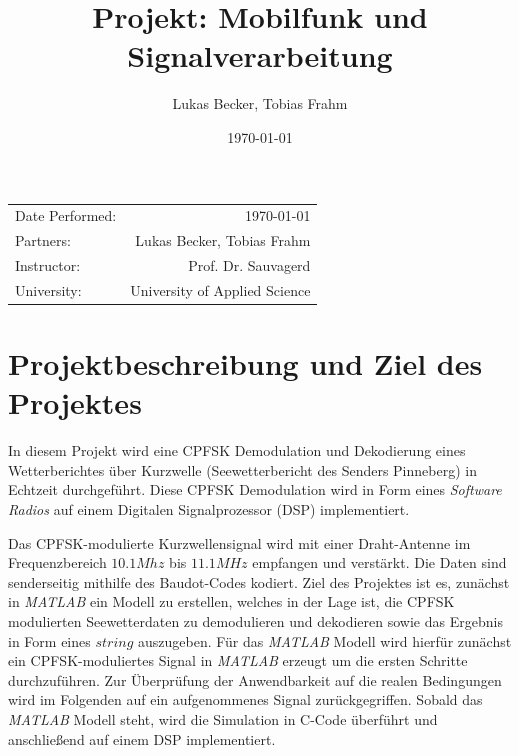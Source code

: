 \documentclass{article}
\title{Projekt: Mobilfunk und Signalverarbeitung} %
\author{Lukas Becker, Tobias Frahm} %
\date{\today} %
\begin{document}
\maketitle %

\begin{center}
\begin{tabular}{l r}
Date Performed: & \today \\ %
Partners: & Lukas Becker, Tobias Frahm \\ %
Instructor: & Prof. Dr. Sauvagerd \\%
University: & University of Applied Science 
\end{tabular}
\end{center}

\begin{acronym}
\end{acronym}



\section{Projektbeschreibung und Ziel des Projektes}

In diesem Projekt wird eine \ac{CPFSK} Demodulation und Dekodierung eines Wetterberichtes über Kurzwelle 
(Seewetterbericht des  Senders  Pinneberg)  in  Echtzeit  durchgeführt. 
Diese  \ac{CPFSK} Demodulation  wird  in  Form  eines  \textit{Software  Radios}  auf  einem  
Digitalen Signalprozessor (DSP) implementiert. 

Das \ac{CPFSK}-modulierte Kurzwellensignal wird mit einer Draht-Antenne im Frequenzbereich
$10.1Mhz$ bis $11.1MHz$ empfangen und verstärkt. Die Daten sind senderseitig mithilfe des Baudot-Codes kodiert. Ziel des Projektes ist es, zunächst in \textit{MATLAB} ein Modell zu erstellen, welches
in der Lage ist, die \ac{CPFSK} modulierten Seewetterdaten zu demodulieren und dekodieren sowie das Ergebnis in Form eines $string$ auszugeben. 
Für das \textit{MATLAB} Modell wird hierfür zunächst ein \ac{CPFSK}-moduliertes Signal in \textit{MATLAB} erzeugt um die ersten 
Schritte durchzuführen. Zur Überprüfung der Anwendbarkeit auf die realen Bedingungen wird im Folgenden auf ein aufgenommenes Signal zurückgegriffen.
Sobald das \textit{MATLAB} Modell steht, wird die Simulation in C-Code überführt und anschließend 
auf einem DSP implementiert. 
\end{document}
